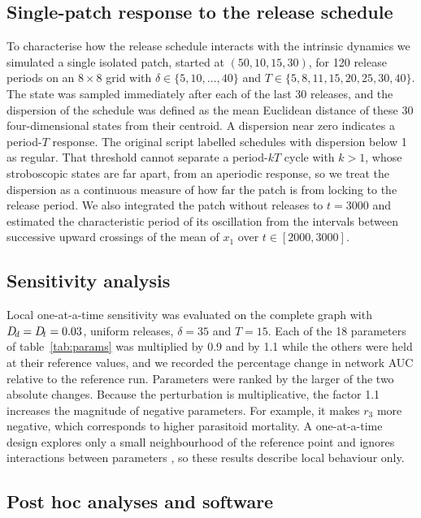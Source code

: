 \subsection{Single-patch response to the release schedule}
\label{sec:strobe}

To characterise how the release schedule interacts with the intrinsic dynamics we simulated a single isolated patch, started at $(50,10,15,30)$, for 120 release periods on an $8\times8$ grid with $\delta\in\{5,10,\dots,40\}$ and $T\in\{5,8,11,15,20,25,30,40\}$. The state was sampled immediately after each of the last 30 releases, and the dispersion of the schedule was defined as the mean Euclidean distance of these 30 four-dimensional states from their centroid. A dispersion near zero indicates a period-$T$ response. The original script labelled schedules with dispersion below 1 as regular. That threshold cannot separate a period-$kT$ cycle with $k > 1$, whose stroboscopic states are far apart, from an aperiodic response, so we treat the dispersion as a continuous measure of how far the patch is from locking to the release period. We also integrated the patch without releases to $t = 3000$ and estimated the characteristic period of its oscillation from the intervals between successive upward crossings of the mean of $x_1$ over $t\in[2000,3000]$.

\subsection{Sensitivity analysis}
\label{sec:sensitivity}

Local one-at-a-time sensitivity was evaluated on the complete graph with $D_{\!d} = D_{\!t} = 0.03$, uniform releases, $\delta = 35$ and $T = 15$. Each of the 18 parameters of table~\ref{tab:params} was multiplied by 0.9 and by 1.1 while the others were held at their reference values, and we recorded the percentage change in network AUC relative to the reference run. Parameters were ranked by the larger of the two absolute changes. Because the perturbation is multiplicative, the factor 1.1 increases the magnitude of negative parameters. For example, it makes $r_3$ more negative, which corresponds to higher parasitoid mortality. A one-at-a-time design explores only a small neighbourhood of the reference point and ignores interactions between parameters \citep{saltelli2019}, so these results describe local behaviour only.

\subsection{Post hoc analyses and software}
\label{sec:software}

